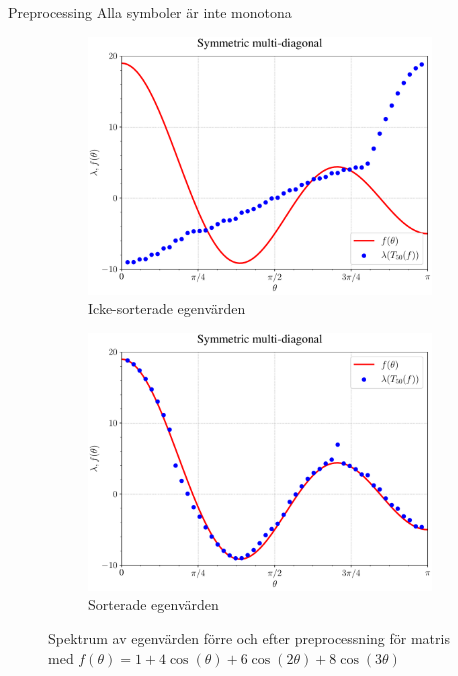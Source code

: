 \documentclass{beamer}
\begin{document}
\begin{frame}{Preprocessing}
    Alla symboler är inte monotona%
    \begin{figure}[H]
    \centering
    \begin{subfigure}{0.49\textwidth}
        \includegraphics[width=\textwidth]{images/Preproc2unsorted.pdf}
        \caption{Icke-sorterade egenvärden}
        \label{fig:per_bi_lap_sym}
    \end{subfigure}
    \hfill
    \begin{subfigure}{0.49\textwidth}
        \includegraphics[width=\textwidth]{images/Preproc2sorted.pdf}
        \caption{Sorterade egenvärden}
        \label{fig:eigval_per_bilap}
    \end{subfigure}
    \caption{Spektrum av egenvärden förre och efter preprocessning för matris med $f(\theta)=1+4\cos(\theta)+6\cos(2\theta)+8\cos(3\theta)$}
    \label{fig:Spectrum Laplace & perturbed}
    \end{figure}
\end{frame}
\end{document}
